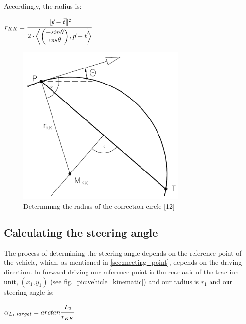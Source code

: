 Accordingly, the radius is:

\begin{center}
$ r_{KK}=
\cfrac{\| \vec{p} - \vec{t} \|^2}{2 \cdot \left \langle 
	\begin{pmatrix}
		-sin \theta \\
		cos \theta
	\end{pmatrix}
	, \vec{p} - \vec{t}
	\right \rangle
	}$
\end{center}

\begin{figure}[h]
\centering
\includegraphics[width=0.75\textwidth]{./Chapters/Figures/correction_circle_radius.png}
\caption{Determining the radius of the correction circle [12] \label{pic:correction_circle_radius}}
\end{figure}

\subsection{Calculating the steering angle}
\label{sec:calculating_steering_angle}

The process of determining the steering angle depends on the reference point of the vehicle, which, as mentioned in \ref{sec:meeting_point}, depends on the driving direction. In forward driving our reference point is the rear axis of the traction unit, $(x_1,y_1)$ (see fig. \ref{pic:vehicle_kinematic}) and our radius is $r_1$ and our steering angle is:

\begin{center}
$ \alpha_{L_1,target} = arctan \cfrac{L_2}{r_{KK}} $
\end{center}

